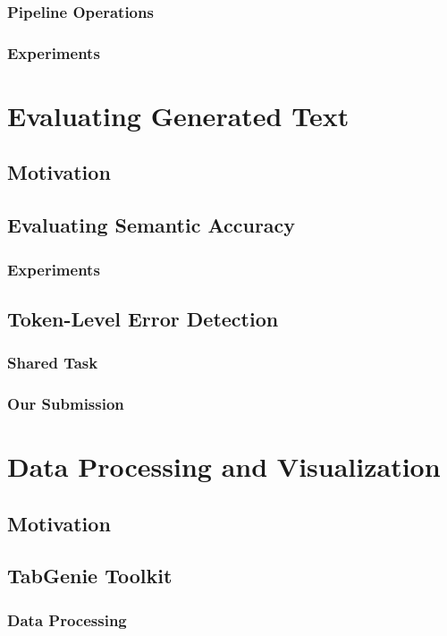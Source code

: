 \documentclass[12pt,notitlepage,a4paper,openright]{report}
\begin{document}
\subsection{Pipeline Operations}
\subsection{Experiments}

\chapter{Evaluating Generated Text}
\section{Motivation}
\section{Evaluating Semantic Accuracy}
\subsection{Experiments}
\section{Token-Level Error Detection}
\subsection{Shared Task}
\subsection{Our Submission}

\chapter{Data Processing and Visualization}
\section{Motivation}
\section{TabGenie Toolkit}
\subsection{Data Processing}
\end{document}
